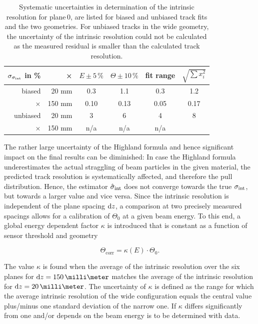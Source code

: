 \begin{table}[tbp]
 \begin{center}
  \begin{tabular}{r|r|c|c|c||c}
  $\sigma_{\sigma_{\textrm{int}}}$ in \% & × & $E\pm5\,\%$ & $\Theta\pm10\,\%$ & fit range & $\sqrt{\sum x_i^2}$\\ \hline
  biased   &  20 mm & 0.3 & 1.1  & 0.3 & 1.2 \\
  ×        & 150 mm & 0.10 & 0.13 & 0.05 & 0.17\\
  unbiased &  20 mm &   3 & 6    & 4  & 8\\
  ×        & 150 mm & n/a & n/a  & n/a & \\
  \end{tabular}
    \caption[Systematic uncertainties for plane\,0]{Systematic uncertainties in determination of the intrinsic resolution for plane\,0, are listed for biased and unbiased track fits and the two geometries.
  For unbiased tracks in the wide geometry, the uncertainty of the intrinsic resolution could not be calculated as the measured residual is smaller than the calculated track resolution.}
  \label{tab:uncerts}
 \end{center}
\end{table}

The rather large uncertainty of the Highland formula and hence significant impact on the final results can be diminished: 
In case the Highland formula underestimates the actual straggling of beam particles in the given material, the predicted track resolution is systematically affected, and therefore the pull distribution. 
Hence, the estimator $\hat{\sigma}_{\textrm{int}}$ does not converge towards the true $\sigma_{\textrm{int}}$, but towards a larger value and vice versa. 
Since the intrinsic resolution is independent of the plane spacing $\textrm{d}z$, a comparison at two precisely measured spacings allows for a calibration of $\Theta_0$ at a given beam energy. 
To this end, a global energy dependent factor $\kappa$ is introduced that is constant as a function of sensor threshold and geometry

\begin{equation}
 \Theta_{\textrm{corr}} = \kappa(E) \cdot \Theta_0.
 \label{eq:thetacorr}
\end{equation}

\noindent
The value $\kappa$ is found when the average of the intrinsic resolution over the six planes for $\dz = 150\,\milli\meter$ matches the average of the intrinsic resolution for $\dz = 20\,\milli\meter$. 
The uncertainty of $\kappa$ is defined as the range for which the average intrinsic resolution of the wide configuration equals the central value plus/minus one standard deviation of the narrow one. 
If $\kappa$ differs significantly from one and/or depends on the beam energy is to be determined with data. 


